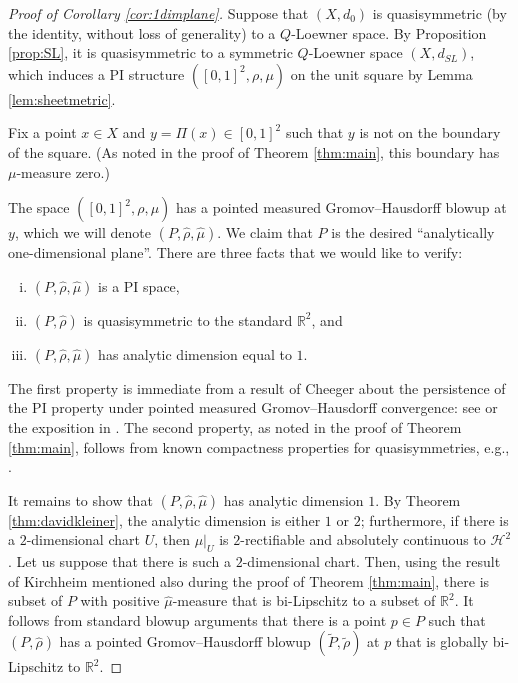\documentclass{amsart}
\theoremstyle{plain}
\theoremstyle{definition}
\numberwithin{equation}{section}
\numberwithin{theorem}{section}
\newcommand{\RR}{\mathbb{R}}
\begin{document}
\begin{proof}[Proof of Corollary \ref{cor:1dimplane}]
Suppose that $(X,d_0)$ is quasisymmetric (by the identity, without loss of generality) to a $Q$-Loewner space. By Proposition \ref{prop:SL}, it is quasisymmetric to a symmetric $Q$-Loewner space $(X,d_{SL})$, which induces a PI structure $([0,1]^2, \rho, \mu)$ on the unit square by Lemma \ref{lem:sheetmetric}.

Fix a point $x\in X$ and $y=\Pi(x)\in [0,1]^2$ such that $y$ is not on the boundary of the square. (As noted in the proof of Theorem \ref{thm:main}, this boundary has $\mu$-measure zero.)

The space $([0,1]^2, \rho, \mu)$ has a pointed measured Gromov--Hausdorff blowup at $y$, which we will denote $(P,\hat{\rho},\hat{\mu})$. We claim that $P$ is the desired ``analytically one-dimensional plane''. There are three facts that we would like to verify:
\begin{enumerate}[(i)]
\item $(P,\hat{\rho},\hat{\mu})$ is a PI space,
\item $(P,\hat{\rho})$ is quasisymmetric to the standard $\mathbb{R}^2$, and
\item $(P,\hat{\rho},\hat{\mu})$ has analytic dimension equal to $1$.
\end{enumerate}
The first property is immediate from a result of Cheeger about the persistence of the PI property under pointed measured Gromov--Hausdorff convergence: see \cite[Theorem 9.6]{Ch} or the exposition in \cite[Ch. 11]{HKST}. The second property, as noted in the proof of Theorem \ref{thm:main}, follows from known compactness properties for quasisymmetries, e.g., \cite[Lemma 2.4.7]{KL}.

It remains to show that $(P,\hat{\rho},\hat{\mu})$ has analytic dimension $1$. By Theorem \ref{thm:davidkleiner}, the analytic dimension is either $1$ or $2$; furthermore, if there is a $2$-dimensional chart $U$, then $\mu|_U$ is $2$-rectifiable and absolutely continuous to $\mathcal{H}^2$. Let us suppose that there is such a $2$-dimensional chart. Then, using the result of Kirchheim \cite{Kirchheim} mentioned also during the proof of Theorem \ref{thm:main}, there is subset of $P$ with positive $\hat{\mu}$-measure that is bi-Lipschitz to a subset of $\RR^2$. It follows from standard blowup arguments that there is a point $p\in P$ such that $(P, \hat{\rho})$ has a pointed Gromov--Hausdorff blowup $(\tilde{P}, \tilde{\rho})$ at $p$ that is globally bi-Lipschitz to $\RR^2$. 


\end{proof}
\end{document}
